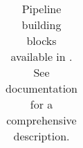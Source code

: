 \begin{table}[]
\begin{tabular}{lll}
          \bottomrule
      \end{tabular}

      \caption{Pipeline building blocks available in \ade. See \ade documentation for a comprehensive description.}\label{tab:blocks}

\end{table}


